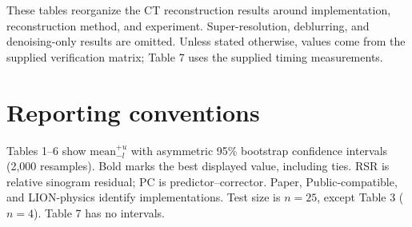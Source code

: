 \ifpdf
    \graphicspath{{Sections/4_results_figs/Raster/}{Sections/4_results_figs/PDF/}{Sections/4_results_figs/}}
\else
    \graphicspath{{Sections/4_results_figs/Vector/}{Sections/4_results_figs/}}
\fi

\noindent These tables reorganize the CT reconstruction results around implementation,
reconstruction method, and experiment. Super-resolution, deblurring, and denoising-only
results are omitted. Unless stated otherwise, values come from the supplied verification
matrix; Table 7 uses the supplied timing measurements.

\section*{Reporting conventions}
Tables 1--6 show $\mathrm{mean}^{+u}_{-l}$ with asymmetric 95\% bootstrap confidence
intervals (2,000 resamples). Bold marks the best displayed value, including ties. RSR is
relative sinogram residual; PC is predictor--corrector. Paper, Public-compatible, and
LION-physics identify implementations. Test size is
$n=25$, except Table 3 ($n=4$). Table 7 has no intervals.

\clearpage

